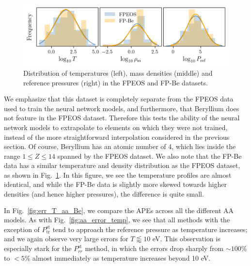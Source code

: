 \documentclass[%
 preprint,
 superscriptaddress,
 amsmath,amssymb,
longbibliography,
]{revtex4-2}
\newcommand{\Pstrr}{P^\textrm{st}_{rr}}
\newcommand{\Psttr}{P^\textrm{st}_\textrm{tr}}
\begin{document}
\begin{figure}
    \centering
    \includegraphics{../figs/Be_FPEOS_dist_comp.png}
    \caption{Distribution of temperatures (left), mass densities (middle) and reference pressures (right) in the FPEOS \cite{Militzer_EOS_database} and FP-Be \cite{Hu_Be_EOS} datasets.}
    \label{fig:Be_dist_comp}
\end{figure}


We emphasize that this dataset is completely separate from the FPEOS data used to train the neural network models, and furthermore, that Beryllium does not feature in the FPEOS dataset. Therefore this tests the ability of the neural network models to extrapolate to elements on which they were not trained, instead of the more straightforward interpolation considered in the previous section. Of course, Beryllium has an atomic number of 4, which lies inside the range $1\leq Z\leq 14$ spanned by the FPEOS dataset. We also note that the FP-Be data has a similar temperature and density distribution as the FPEOS dataset, as shown in Fig.~\ref{fig:Be_dist_comp}. In this figure, we see the temperature profiles are almost identical, and while the FP-Be data is slightly more skewed towards higher densities (and hence higher pressures), the difference is quite small.

In Fig.~\ref{fig:err_T_aa_Be}, we compare the APEs across all the different AA models. As with Fig.~\ref{fig:aa_error_temp}, we see that all methods with the exception of $\Psttr$ tend to approach the reference pressure as temperature increases; and we again observe very large errors for $T\lessapprox 10$ eV. This observation is especially stark for the $\Pstrr$ method, in which the errors drop sharply from $\sim 100\%$ to $<5\%$ almost immediately as temperature increases beyond 10 eV.
\end{document}
